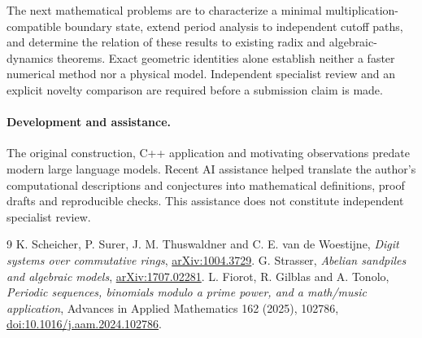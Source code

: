 \documentclass[11pt]{article}
\begin{document}
The next mathematical problems are to characterize a minimal
multiplication-compatible boundary state, extend period analysis to
independent cutoff paths, and determine the relation of these results to
existing radix and algebraic-dynamics theorems. Exact geometric identities
alone establish neither a faster numerical method nor a physical model.
Independent specialist review and an explicit novelty comparison are
required before a submission claim is made.

\paragraph{Development and assistance.}
The original construction, C++ application and motivating observations
predate modern large language models. Recent AI assistance helped translate
the author's computational descriptions and conjectures into mathematical
definitions, proof drafts and reproducible checks. This assistance does not
constitute independent specialist review.

\begin{thebibliography}{9}
 K. Scheicher, P. Surer, J. M. Thuswaldner and
C. E. van de Woestijne, \emph{Digit systems over commutative rings},
\href{https://arxiv.org/abs/1004.3729}{arXiv:1004.3729}.
 G. Strasser, \emph{Abelian sandpiles and algebraic
models}, \href{https://arxiv.org/abs/1707.02281}{arXiv:1707.02281}.
 L. Fiorot, R. Gilblas and A. Tonolo,
\emph{Periodic sequences, binomials modulo a prime power, and a math/music
application}, Advances in Applied Mathematics 162 (2025), 102786,
\href{https://doi.org/10.1016/j.aam.2024.102786}{doi:10.1016/j.aam.2024.102786}.
\end{thebibliography}
\end{document}
